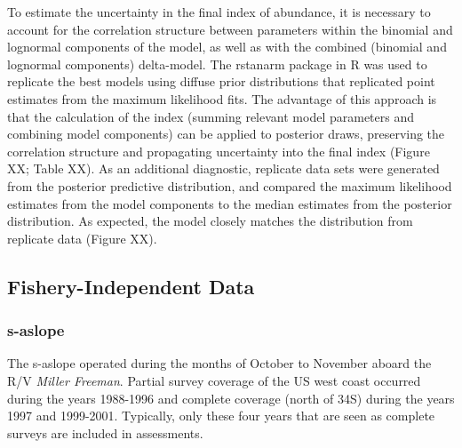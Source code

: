 \documentclass[11pt,
  english,
  a4paper,
]{article}
\begin{document}
\leavevmode\tagmcend\tagstructend\par


To estimate the uncertainty in the final index of abundance, it is necessary to account for the correlation structure between parameters within the binomial and lognormal components of the model, as well as with the combined (binomial and lognormal components) delta-model. The rstanarm package in R was used to replicate the best models using diffuse prior distributions that replicated point estimates from the maximum likelihood fits. The advantage of this approach is that the calculation of the index (summing relevant model parameters and combining model components) can be applied to posterior draws, preserving the correlation structure and propagating uncertainty into the final index (Figure XX; Table XX). As an additional diagnostic, replicate data sets were generated from the posterior predictive distribution, and compared the maximum likelihood estimates from the model components to the median estimates from the posterior distribution. As expected, the model closely matches the distribution from replicate data (Figure XX).

\leavevmode\tagmcend\tagstructend\par


\hypertarget{fishery-independent-data}{%
\subsection{Fishery-Independent Data}\label{fishery-independent-data}}

\leavevmode\tagmcend\tagstructend


\hypertarget{section}{%
\subsubsection{\texorpdfstring{\acrlong{s-aslope}}{}}\label{section}}

\leavevmode\tagmcend\tagstructend


The \gls{s-aslope} operated during the months of October to November aboard the R/V \emph{Miller Freeman}. Partial survey coverage of the US west coast occurred during the years 1988-1996 and complete coverage (north of 34\textquotesingle S) during the years 1997 and 1999-2001. Typically, only these four years that are seen as complete surveys are included in assessments.
\end{document}

